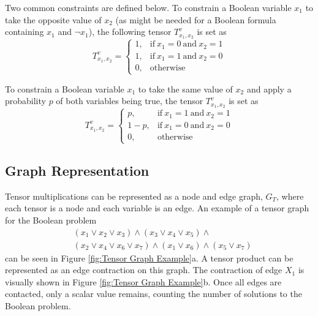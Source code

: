 \documentclass[12pt,twocolumn]{article}
\begin{document}
Two common constraints are defined below. To constrain a Boolean variable \(x_1\) to take the opposite value of \(x_2\) (as might be needed for a Boolean formula containing \(x_1\) and \(\neg x_1\)), the following tensor \(T^v_{x_1,x_2}\) is set as \begin{equation*}
T^v_{x_1,x_2}=
\begin{cases}
  1, & \text{if}\ x_1=0\ \text{and}\ x_2=1\\
  1, & \text{if}\ x_1=1\ \text{and}\ x_2=0\\
  0, & \text{otherwise}
\end{cases}
\end{equation*}

To constrain a Boolean variable \(x_1\) to take the same value of \(x_2\) and apply a probability \(p\) of both variables being true, the tensor \(T^v_{x_1,x_2}\) is set as \begin{equation*}
T^v_{x_1,x_2}=
\begin{cases}
    p, & \text{if}\ x_1=1\ \text{and}\ x_2=1 \\
    1-p, & \text{if}\ x_1=0\ \text{and}\ x_2=0 \\
    0, & \text{otherwise}
\end{cases}
\end{equation*}

\hypertarget{graph-representation}{%
\subsection{Graph Representation}\label{graph-representation}}

Tensor multiplications can be represented as a node and edge graph, \(G_T\), where each tensor is a node and each variable is an edge. An example of a tensor graph for the Boolean problem \begin{equation*}
\begin{split}
& (x_1 \lor x_2 \lor x_3) \land (x_3 \lor x_4 \lor x_5) \land \\
& (x_2 \lor x_4 \lor x_6 \lor x_7) \land (x_1 \lor x_6) \land (x_5 \lor x_7)
\end{split}
\end{equation*} can be seen in Figure \ref{fig:Tensor Graph Example}a. A tensor product can be represented as an edge contraction on this graph. The contraction of edge \(X_1\) is visually shown in Figure \ref{fig:Tensor Graph Example}b. Once all edges are contacted, only a scalar value remains, counting the number of solutions to the Boolean problem.
\end{document}
